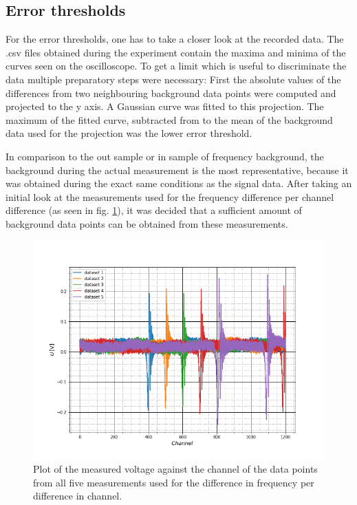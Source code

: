 \subsection{Error thresholds}
For the error thresholds, one has to take a closer look at the recorded data. The .csv files obtained during the experiment contain the maxima and minima of the curves seen on the oscilloscope. To get a limit which is useful to discriminate the data multiple preparatory steps were necessary: First the absolute values of the differences from two neighbouring background data points were computed and projected to the y axis. A Gaussian curve was fitted to this projection. The maximum of the fitted curve, subtracted from to the mean of the background data used for the projection was the lower error threshold.\par 
In comparison to the out sample or in sample of frequency background, the background during the actual measurement is the most representative, because it was obtained during the exact same conditions as the signal data.
After taking an initial look at the measurements used for the frequency difference per channel difference (as seen in fig. \ref{all_dx}), it was decided that a sufficient amount of background data points can be obtained from these measurements. 
\begin{figure}[h]
	\includegraphics[scale=0.5]{Bild/all_dx.png}
	\centering
	\caption[Plot of all data used for the discriminator determination]{Plot of the measured voltage against the channel of the data points from all five measurements used for the difference in frequency per difference in channel.}
	\label{all_dx}
\end{figure}

